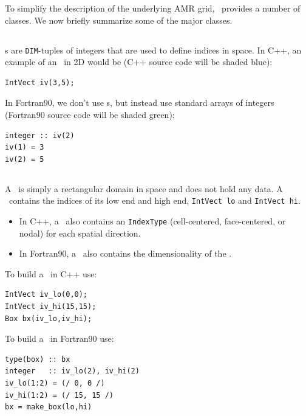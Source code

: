 To simplify the description of the underlying AMR grid, \BoxLib\
provides a number of classes.  We now briefly summarize some of the major
classes.

\subsection{\IntVect}

\IntVect s are {\tt DIM}-tuples of integers that are used to define
indices in space.  In C++, an example of an \IntVect\ in 2D would be
(C++ source code will be shaded blue):
\begin{lstlisting}[backgroundcolor=\color{light-blue}]
IntVect iv(3,5);
\end{lstlisting}
In Fortran90, we don't use \IntVect s, but instead use standard
arrays of integers (Fortran90 source code will be shaded green):
\begin{lstlisting}[backgroundcolor=\color{light-green}]
integer :: iv(2)
iv(1) = 3
iv(2) = 5
\end{lstlisting}

\subsection{\BoxType}

A \BoxType\ is simply a rectangular domain in space and does not hold any data.
A \BoxType\ contains the indices of its low end and high end, 
{\tt IntVect lo} and {\tt IntVect hi}.
\begin{itemize}
\item In C++, a \BoxType\ also
contains an {\tt IndexType} (cell-centered, face-centered, or nodal) for each
spatial direction.
\item In Fortran90, a \BoxType\ also contains the dimensionality 
of the \BoxType.
\end{itemize}
To build a \BoxType\ in C++ use:
\begin{lstlisting}[backgroundcolor=\color{light-blue}]
IntVect iv_lo(0,0);
IntVect iv_hi(15,15);
Box bx(iv_lo,iv_hi);
\end{lstlisting}
To build a \BoxType\ in Fortran90 use:
\begin{lstlisting}[backgroundcolor=\color{light-green}]
type(box) :: bx
integer   :: iv_lo(2), iv_hi(2)
iv_lo(1:2) = (/ 0, 0 /)
iv_hi(1:2) = (/ 15, 15 /)
bx = make_box(lo,hi)
\end{lstlisting}

